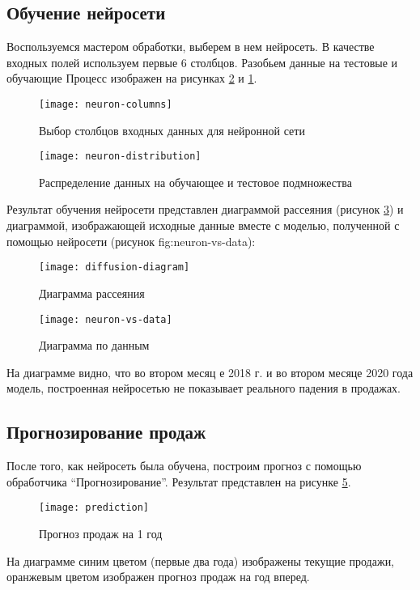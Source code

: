 \documentclass[a4paper,14pt]{extarticle}
\begin{document}
\subsection{Обучение нейросети}
Воспользуемся мастером обработки, выберем в нем нейросеть. В качестве входных
полей используем первые 6 столбцов. Разобьем данные на тестовые и обучающие
Процесс изображен на рисунках \ref{fig:neuron-distribution} и \ref{fig:neuron-columns}.
\begin{figure}[H]
    \centering
    \texttt{[image: neuron-columns]}
    \caption{Выбор столбцов входных данных для нейронной сети}
    \label{fig:neuron-columns}
\end{figure}
\begin{figure}[H]
    \centering
    \texttt{[image: neuron-distribution]}
    \caption{Распределение данных на обучающее и тестовое подмножества}
    \label{fig:neuron-distribution}
\end{figure}

Результат обучения нейросети представлен диаграммой рассеяния (рисунок
\ref{fig:diffusion-diagram}) и диаграммой, изображающей исходные данные вместе с
моделью, полученной с помощью нейросети (рисунок fig:neuron-vs-data):
\begin{figure}[H]
    \centering
    \texttt{[image: diffusion-diagram]}
    \caption{Диаграмма рассеяния}
    \label{fig:diffusion-diagram}
\end{figure}
\begin{figure}[H]
    \centering
    \texttt{[image: neuron-vs-data]}
    \caption{Диаграмма по данным}
    \label{fig:neuron-vs-data}
\end{figure}
На диаграмме видно, что во втором месяц е 2018 г. и во втором месяце 2020 года
модель, построенная нейросетью не показывает реального падения в продажах.

\subsection{Прогнозирование продаж}
После того, как нейросеть была обучена, построим прогноз с помощью обработчика
\enquote{Прогнозирование}. Результат представлен на рисунке \ref{fig:prediction}.
\begin{figure}[H]
    \centering
    \texttt{[image: prediction]}
    \caption{Прогноз продаж на 1 год}
    \label{fig:prediction}
\end{figure}
На диаграмме синим цветом (первые два года) изображены текущие продажи,
оранжевым цветом изображен прогноз продаж на год вперед.
\end{document}
